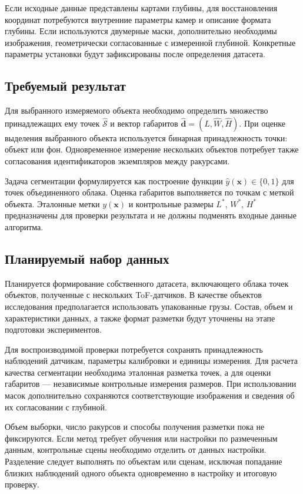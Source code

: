 \documentclass{misisarticle}
\begin{document}
Если исходные данные представлены картами глубины, для восстановления координат потребуются внутренние параметры камер и описание формата глубины. Если используются двумерные маски, дополнительно необходимы изображения, геометрически согласованные с измеренной глубиной. Конкретные параметры установки будут зафиксированы после определения датасета.

\subsection{Требуемый результат}

Для выбранного измеряемого объекта необходимо определить множество принадлежащих ему точек $\widehat{\mathcal{S}}$ и вектор габаритов $\widehat{\mathbf{d}}=(\widehat{L},\widehat{W},\widehat{H})$. При оценке выделения выбранного объекта используется бинарная принадлежность точки: объект или фон. Одновременное измерение нескольких объектов потребует также согласования идентификаторов экземпляров между ракурсами.

Задача сегментации формулируется как построение функции $\widehat{y}(\mathbf{x})\in\{0,1\}$ для точек объединенного облака. Оценка габаритов выполняется по точкам с меткой объекта. Эталонные метки $y(\mathbf{x})$ и контрольные размеры $L^*$, $W^*$, $H^*$ предназначены для проверки результата и не должны подменять входные данные алгоритма.

\subsection{Планируемый набор данных}

Планируется формирование собственного датасета, включающего облака точек объектов, полученные с нескольких ToF-датчиков. В качестве объектов исследования предполагается использовать упакованные грузы. Состав, объем и характеристики данных, а также формат разметки будут уточнены на этапе подготовки экспериментов.

Для воспроизводимой проверки потребуется сохранять принадлежность наблюдений датчикам, параметры калибровки и единицы измерения. Для расчета качества сегментации необходима эталонная разметка точек, а для оценки габаритов --- независимые контрольные измерения размеров. При использовании масок дополнительно сохраняются соответствующие изображения и сведения об их согласовании с глубиной.

Объем выборки, число ракурсов и способы получения разметки пока не фиксируются. Если метод требует обучения или настройки по размеченным данным, контрольные сцены необходимо отделить от данных настройки. Разделение следует выполнять по объектам или сценам, исключая попадание близких наблюдений одного объекта одновременно в настройку и итоговую проверку.
\end{document}
